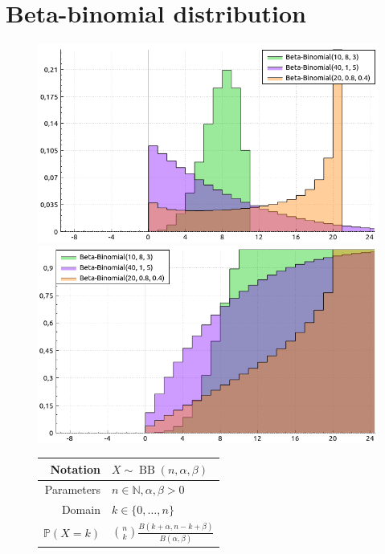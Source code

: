 \documentclass[a4paper,11pt]{article}
\theoremstyle{plain}
\theoremstyle{definition}
\newcommand{\MP}{\mathbb{P}}
\newcommand{\MN}{\mathbb{N}}
\begin{document}
	\section{Beta-binomial distribution}
	\begin{figure}[!htb]\centering
		\begin{minipage}{0.55\textwidth}
			\includegraphics[width=\linewidth, right]{beta-binomial_pmf}
			\captionsetup{labelformat=empty}
			\includegraphics[width=\linewidth, right]{beta-binomial_cdf}
			\captionsetup{labelformat=empty}
		\end{minipage}
		\begin{minipage}{0.4\textwidth}
			\begin{tabular}{| r | l |}
				\hline
				Notation & $ X \sim \operatorname{BB}(n, \alpha, \beta) $ \\
				\hline
				Parameters & $ n \in \MN, \alpha, \beta > 0  $ \\
				\hline
				Domain & $ k \in \{0, \dots, n  \} $  \\
				\hline
				$\MP(X = k)$ & $\binom{n}{k} \frac{B(k+\alpha, n-k+\beta)}{B(\alpha, \beta)}  $ \\

\end{tabular}
\end{minipage}
\end{figure}
\end{document}
